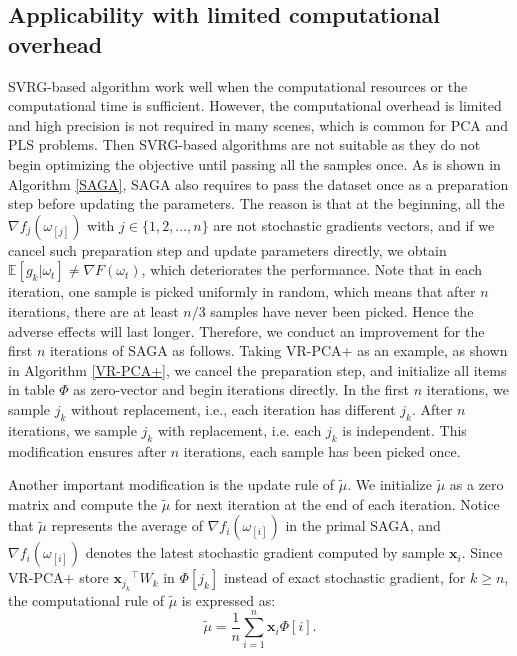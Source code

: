 \documentclass[runningheads,a4paper]{llncs}
\begin{document}
 \subsection{Applicability with limited computational overhead }
 SVRG-based algorithm work well when the computational resources or the computational time is sufficient. 
 However, the computational overhead is limited and high precision is not required in many scenes, which is common for PCA and PLS problems.
 Then SVRG-based algorithms are not suitable as they do not begin optimizing the objective until passing all the samples once. 
 As is shown in Algorithm \ref{SAGA}, SAGA also requires to pass the dataset once as a preparation step before updating the parameters. The reason is that at the beginning,  all the $\nabla f_j(\omega_{[j]})$ with $j \in \{1,2,...,n\}$ are not stochastic gradients vectors, and if we cancel such preparation step and update parameters directly, we obtain $\mathbb{E}[g_k | \omega_t] \neq \nabla F(\omega_{t})$, which deteriorates the performance.
 Note that in each iteration, one sample is picked uniformly in random, which means that after $n$ iterations, there are at least $n/3$ samples have never been picked. Hence the adverse effects will last longer. 
 Therefore, we conduct an improvement for the first $n$ iterations of SAGA as follows.
 Taking VR-PCA+ as an example, as shown in Algorithm \ref{VR-PCA+}, we cancel the preparation step, and initialize all items in table $\Phi$ as zero-vector and begin iterations directly.
 In the first $n$ iterations, we sample $j_k$ without replacement, i.e., each iteration has different $j_k$. After $n$ iterations, we sample $j_k$ with replacement, i.e. each $j_k$ is independent. This modification ensures after $n$ iterations, each sample has been picked once.
 
 Another important modification is the update rule of $\tilde{\mu}$.
 We initialize $\tilde{\mu}$ as a zero matrix and compute the $\tilde{\mu}$ for next iteration  at the end of each iteration.
 Notice that $\tilde{\mu}$ represents the average of $\nabla f_i(\omega_{[i]})$ in the primal SAGA, and $\nabla f_i(\omega_{[i]})$ denotes the latest stochastic gradient computed by sample $\mathbf{x}_i$. 
 Since VR-PCA+ store ${\mathbf{x}_{j_k}}^{\top}W_k$ in $\Phi[j_k]$ instead of exact stochastic gradient, for $k \geqslant n$, the computational rule of $\tilde{\mu}$ is expressed as:
 \begin{equation}
 \label{k>=n}
 \tilde{\mu} = \frac{1}{n} \sum\limits_{i=1}^{n}\mathbf{x}_{i}\Phi[i].
 \end{equation}
 
\end{document}
